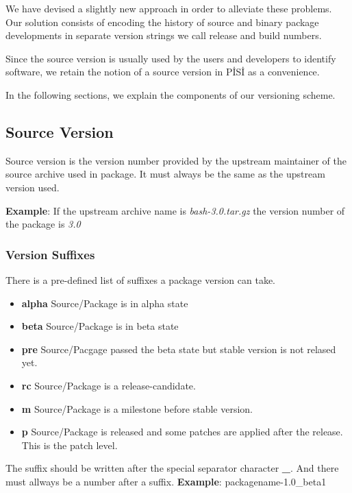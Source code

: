 \documentclass[a4paper,11pt]{article}
\begin{document}
We have devised a slightly new approach in order to alleviate these
problems. Our solution consists of encoding the history of source and
binary package developments in separate version strings we call release and
build numbers.

Since the source version is usually used by the users and developers
to identify software, we retain the notion of a source version in
P\.IS\.I as a convenience. 

In the following sections, we explain the components of our
versioning scheme.

\subsection{Source Version}

Source version is the version number provided by the
upstream maintainer of the source archive used in package. It must 
always be the same as the upstream version used.

\textbf{Example}: If the upstream archive name is
\emph{bash-3.0.tar.gz} the version number of the package is \emph{3.0}

\subsubsection{Version Suffixes}

There is a pre-defined list of suffixes a package version can
take.

\begin{itemize}
  \item \textbf{alpha} Source/Package is in alpha state
  \item \textbf{beta} Source/Package is in beta state
  \item \textbf{pre} Source/Pacgage passed the beta state but stable
    version is not relased yet.
  \item \textbf{rc} Source/Package is a release-candidate.
  \item \textbf{m} Source/Package is a milestone before stable version.
  \item \textbf{p} Source/Package is released and some patches are
    applied after the release. This is the patch level.
\end{itemize}

The suffix should be written after the special separator
character \textbf{\_}. And there must allways be a number after a
suffix. \textbf{Example}: packagename-1.0\_beta1
\end{document}
